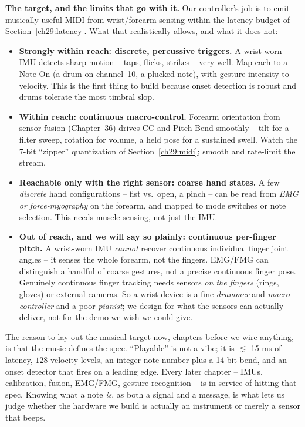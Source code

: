 \begin{goalbox}
\textbf{The target, and the limits that go with it.} Our controller's job is to emit musically
useful MIDI from wrist/forearm sensing within the latency budget of Section~\ref{ch29:latency}. What
that realistically allows, and what it does not:
\begin{itemize}
  \item \textbf{Strongly within reach: discrete, percussive triggers.} A wrist-worn IMU detects sharp
    motion -- taps, flicks, strikes -- very well. Map each to a Note On (a drum on channel~10, a
    plucked note), with gesture intensity to velocity. This is the first thing to build because onset
    detection is robust and drums tolerate the most timbral slop.
  \item \textbf{Within reach: continuous macro-control.} Forearm orientation from sensor fusion
    (Chapter~36) drives CC and Pitch Bend smoothly -- tilt for a filter sweep, rotation for volume, a
    held pose for a sustained swell. Watch the 7-bit ``zipper'' quantization of
    Section~\ref{ch29:midi}; smooth and rate-limit the stream.
  \item \textbf{Reachable only with the right sensor: coarse hand states.} A few \emph{discrete} hand
    configurations -- fist vs.\ open, a pinch -- can be read from \emph{EMG or force-myography} on the
    forearm, and mapped to mode switches or note selection. This needs muscle sensing, not just the
    IMU.
  \item \textbf{Out of reach, and we will say so plainly: continuous per-finger pitch.} A wrist-worn
    IMU \emph{cannot} recover continuous individual finger joint angles -- it senses the whole forearm,
    not the fingers. EMG/FMG can distinguish a handful of coarse gestures, not a precise continuous
    finger pose. Genuinely continuous finger tracking needs sensors \emph{on the fingers} (rings,
    gloves) or external cameras. So a wrist device is a fine \emph{drummer} and \emph{macro-controller}
    and a poor \emph{pianist}; we design for what the sensors can actually deliver, not for the demo we
    wish we could give.
\end{itemize}
\end{goalbox}

\begin{aestheticbox}
The reason to lay out the musical target now, chapters before we wire anything, is that the music
defines the spec. ``Playable'' is not a vibe; it is $\lesssim$ 15 ms of latency, $128$ velocity
levels, an integer note number plus a 14-bit bend, and an onset detector that fires on a leading edge.
Every later chapter -- IMUs, calibration, fusion, EMG/FMG, gesture recognition -- is in service of
hitting that spec. Knowing what a note \emph{is}, as both a signal and a message, is what lets us
judge whether the hardware we build is actually an instrument or merely a sensor that beeps.
\end{aestheticbox}

